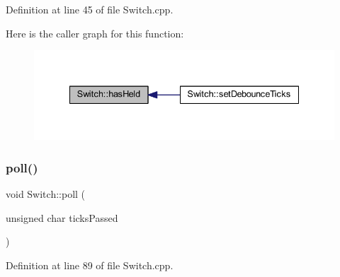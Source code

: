 Definition at line 45 of file Switch.\+cpp.

Here is the caller graph for this function\+:
\nopagebreak
\begin{figure}[H]
\begin{center}
\leavevmode
\includegraphics[width=335pt]{class_switch_a6cb0b78f23c412042b31ce8af317c718_icgraph}
\end{center}
\end{figure}
\mbox{\label{class_switch_a5401c79fd9fda679eae5e4bba5578a35}} 
\subsubsection{\texorpdfstring{poll()}{poll()}}
{\footnotesize\ttfamily void Switch\+::poll (\begin{DoxyParamCaption}\item[{unsigned char}]{ticks\+Passed }\end{DoxyParamCaption})}



Definition at line 89 of file Switch.\+cpp.

